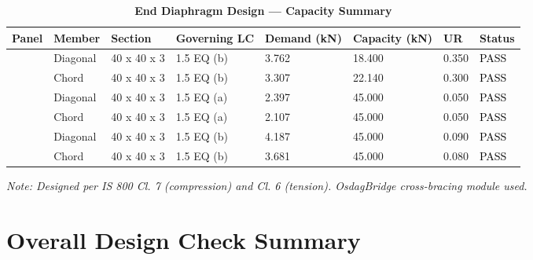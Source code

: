 \documentclass[12pt,a4paper]{report}
\numberwithin{table}{chapter}
\numberwithin{figure}{chapter}
\begin{document}
\vspace{1em}

\begin{longtable}{|C{2.0cm}|L{1.8cm}|C{2.2cm}|C{3.0cm}|C{1.8cm}|C{1.8cm}|C{1.2cm}|C{1.8cm}|}
\caption{\textbf{End Diaphragm Design --- Capacity Summary}}
\hline
\textbf{Panel} & \textbf{Member} & \textbf{Section} & \textbf{Governing LC} & \textbf{Demand (kN)} & \textbf{Capacity (kN)} & \textbf{UR} & \textbf{Status} \\[6pt]
\hline
{} & Diagonal & 40 x 40 x 3 & 1.5 EQ (b) & 3.762 & 18.400 & 0.350 & \textcolor{black}{PASS} \\[6pt]
 & Chord & 40 x 40 x 3 & 1.5 EQ (b) & 3.307 & 22.140 & 0.300 & \textcolor{black}{PASS} \\[6pt]
\hline
{} & Diagonal & 40 x 40 x 3 & 1.5 EQ (a) & 2.397 & 45.000 & 0.050 & \textcolor{black}{PASS} \\[6pt]
 & Chord & 40 x 40 x 3 & 1.5 EQ (a) & 2.107 & 45.000 & 0.050 & \textcolor{black}{PASS} \\[6pt]
\hline
{} & Diagonal & 40 x 40 x 3 & 1.5 EQ (b) & 4.187 & 45.000 & 0.090 & \textcolor{black}{PASS} \\[6pt]
 & Chord & 40 x 40 x 3 & 1.5 EQ (b) & 3.681 & 45.000 & 0.080 & \textcolor{black}{PASS} \\[6pt]
\hline
\end{longtable}
\noindent\textit{Note: Designed per IS 800 Cl. 7 (compression) and Cl. 6 (tension). OsdagBridge cross-bracing module used.}

\section{Overall Design Check Summary}
\label{sec:overall-summary}
\end{document}
